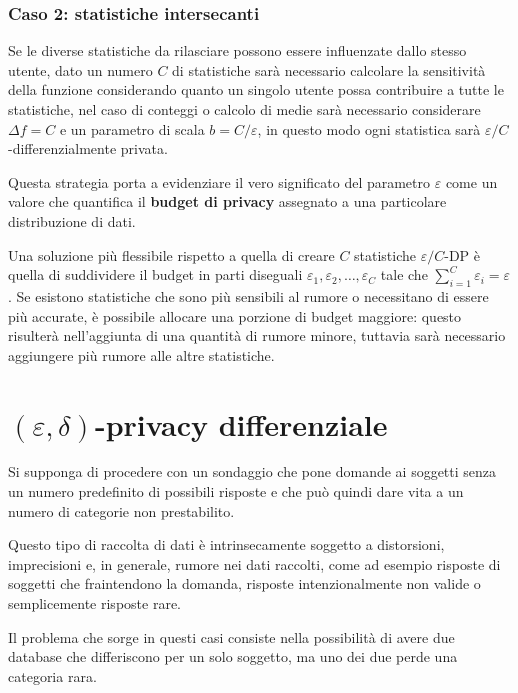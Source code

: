 \subsubsection{Caso 2: statistiche intersecanti}
Se le diverse statistiche da rilasciare possono essere influenzate dallo stesso utente, dato un numero $C$ di statistiche sarà necessario calcolare la sensitività della funzione considerando quanto un singolo utente possa contribuire a tutte le statistiche, nel caso di conteggi o calcolo di medie sarà necessario considerare $\Delta f = C$ e un parametro di scala $b = C / \varepsilon$, in questo modo ogni statistica sarà $\varepsilon / C$-differenzialmente privata.

Questa strategia porta a evidenziare il vero significato del parametro $\varepsilon$ come un valore che quantifica il \textbf{budget di privacy} assegnato a una particolare distribuzione di dati.

Una soluzione più flessibile rispetto a quella di creare $C$ statistiche $\varepsilon / C$-DP è quella di suddividere il budget in parti diseguali $\varepsilon_1, \varepsilon_2, \dots, \varepsilon_C$ tale che $\sum_{i=1}^{C} \varepsilon_i = \varepsilon$. Se esistono statistiche che sono più sensibili al rumore o necessitano di essere più accurate, è possibile allocare una porzione di budget maggiore: questo risulterà nell'aggiunta di una quantità di rumore minore, tuttavia sarà necessario aggiungere più rumore alle altre statistiche.

\section{\texorpdfstring{$(\varepsilon,\delta)$}{TEXT}-privacy differenziale}
Si supponga di procedere con un sondaggio che pone domande ai soggetti senza un numero predefinito di possibili risposte e che può quindi dare vita a un numero di categorie non prestabilito.

Questo tipo di raccolta di dati è intrinsecamente soggetto a distorsioni, imprecisioni e, in generale, rumore nei dati raccolti, come ad esempio risposte di soggetti che fraintendono la domanda, risposte intenzionalmente non valide o semplicemente risposte rare.

Il problema che sorge in questi casi consiste nella possibilità di avere due database che differiscono per un solo soggetto, ma uno dei due perde una categoria rara.

